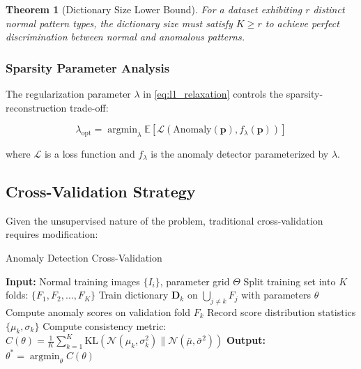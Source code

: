 \documentclass[12pt]{article}
\DeclareMathOperator{\argmin}{argmin}
\newcommand{\dictionary}{\mathbf{D}}
\newcommand{\patch}{\mathbf{p}}
\newtheorem{theorem}{Theorem}[section]
\begin{document}
\begin{theorem}[Dictionary Size Lower Bound]
    \label{thm:dict_size_bound}
    For a dataset exhibiting $r$ distinct normal pattern types, the dictionary size must satisfy $K \geq r$ to achieve perfect discrimination between normal and anomalous patterns.
\end{theorem}

\subsubsection{Sparsity Parameter Analysis}
\label{subsubsec:sparsity_analysis}

The regularization parameter $\lambda$ in \eqref{eq:l1_relaxation} controls the sparsity-reconstruction trade-off:

\begin{equation}
    \label{eq:lambda_analysis}
    \lambda_{\text{opt}} = \argmin_{\lambda} \mathbb{E}\left[\mathcal{L}(\text{Anomaly}(\patch), f_{\lambda}(\patch))\right]
\end{equation}

where $\mathcal{L}$ is a loss function and $f_{\lambda}$ is the anomaly detector parameterized by $\lambda$.

\subsection{Cross-Validation Strategy}
\label{subsec:cross_validation}

Given the unsupervised nature of the problem, traditional cross-validation requires modification:

\begin{algorithm}[H]
    \caption{Anomaly Detection Cross-Validation}
    \label{alg:cv}
    \begin{algorithmic}[1]
        \STATE \textbf{Input:} Normal training images $\{I_i\}$, parameter grid $\Theta$
        \STATE Split training set into $K$ folds: $\{F_1, F_2, \ldots, F_K\}$
        \STATE Train dictionary $\dictionary_k$ on $\bigcup_{j \neq k} F_j$ with parameters $\theta$
        \STATE Compute anomaly scores on validation fold $F_k$
        \STATE Record score distribution statistics $\{\mu_k, \sigma_k\}$
        \ENDFOR
        \STATE Compute consistency metric: $C(\theta) = \frac{1}{K} \sum_{k=1}^K \text{KL}(\mathcal{N}(\mu_k, \sigma_k^2) \| \mathcal{N}(\bar{\mu}, \bar{\sigma}^2))$
        \ENDFOR
        \STATE \textbf{Output:} $\theta^* = \argmin_{\theta} C(\theta)$
    \end{algorithmic}
\end{algorithm}
\end{document}
